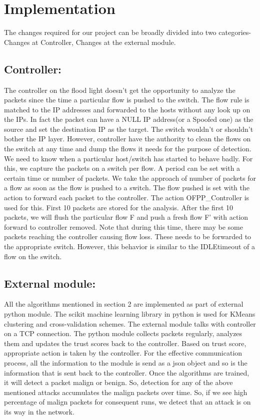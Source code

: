 \documentclass[conference]{IEEEtran}
\begin{document}
\section{\textbf{Implementation}}
The changes required for our project can be broadly divided into two categories- Changes at Controller, Changes at the external module.
\subsection{\textbf{Controller:}}
The controller on the flood light doesn’t get the opportunity to analyze the packets since the time a particular flow is pushed to the switch. The flow rule is matched to the IP addresses and forwarded to the hosts without any look up on the IPs. In fact the packet can have a NULL IP address(or a Spoofed one) as the source and set the destination IP as the target. The switch wouldn’t or shouldn’t bother the IP layer. However, controller have the authority to clean the flows on the switch at any time and dump the flows it needs for the purpose of detection. We need to know when a particular host/switch has started to behave badly. For this, we capture the packets on a switch per flow. A period can be set with a certain time or number of packets. We take the approach of number of packets for a flow as soon as the flow is pushed to a switch. The flow pushed is set with the action to forward each packet to the controller. The action OFPP\_Controller is used for this. First 10 packets are stored for the analysis. After the first 10 packets, we will flush the particular flow F and push a fresh flow F’ with action forward to controller removed. Note that during this time, there may be some packets reaching the controller causing flow loss. These needs to be forwarded to the appropriate switch. However, this behavior is similar to the IDLEtimeout of a flow on the switch.
\subsection{\textbf{External module:}}
All the algorithms mentioned in section 2 are implemented as part of external python module. The scikit machine learning library in python is used for KMeans clustering and cross-validation schemes. The external module talks with controller on a TCP connection. The python module collects packets regularly, analyzes them and updates the trust scores back to the controller. Based on trust score, appropriate action is taken by the controller. For the effective communication process, all the information to the module is send as a json object and so is the information that is sent back to the controller. Once the algorithms are trained, it will detect a packet malign or benign. So, detection for any of the above mentioned attacks accumulates the malign packets over time. So, if we see high percentage of malign packets for consequent runs, we detect that an attack is on its way in the network.
\end{document}

